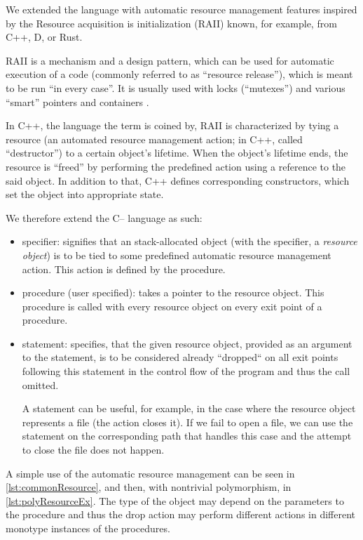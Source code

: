 We extended the \cmm language with automatic resource management features inspired by the Resource acquisition is initialization (RAII) known, for example, from C++, D, or Rust.

RAII is a mechanism and a design pattern, which can be used for automatic execution of a code (commonly referred to as ``resource release''), which is meant to be run ``in every case''. It is usually used with locks (``mutexes'') and various ``smart'' pointers and containers \cite{obiltschnigusing}.

In C++, the language the term is coined by, RAII is characterized by tying a resource (an automated resource management action; in C++, called ``destructor'') to a certain object's lifetime. When the object's lifetime ends, the resource is ``freed'' by performing the predefined action using a reference to the said object. In addition to that, C++ defines corresponding constructors, which set the object into appropriate state.

We therefore extend the C-- language as such:

\begin{itemize}
    \item {} specifier: signifies that an stack-allocated object (with the  specifier, a \emph{resource object}) is to be tied to some predefined automatic resource management action. This action is defined by the  procedure.

    \item {} procedure (user specified): takes a pointer to the resource object. This procedure is called with every resource object on every exit point of a procedure.

    \item {} statement: specifies, that the given resource object, provided as an argument to the  statement, is to be considered already ``dropped`` on all exit points following this statement in the control flow of the program and thus the  call omitted.

    A  statement can be useful, for example, in the case where the resource object represents a file (the  action closes it). If we fail to open a file, we can use the  statement on the corresponding path that handles this case and the attempt to close the file does not happen.
\end{itemize}

A simple use of the automatic resource management can be seen in \cref{lst:commonResource}, and then, with nontrivial polymorphism, in \cref{lst:polyResourceEx}. The type of the object may depend on the parameters to the procedure and thus the drop action may perform different actions in different monotype instances of the procedures.

